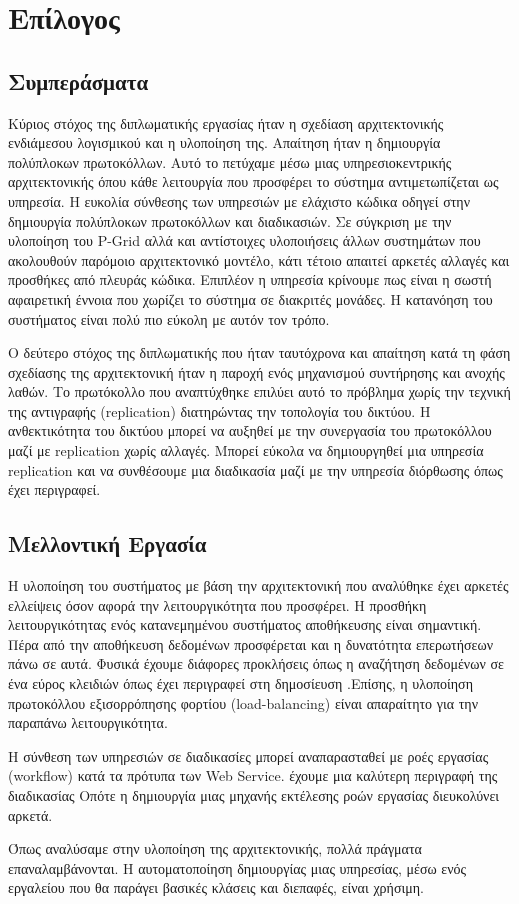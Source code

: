 \chapter{Επίλογος}
\label{chap:Closing}

\section{Συμπεράσματα}

Κύριος στόχος της διπλωματικής εργασίας ήταν η σχεδίαση αρχιτεκτονικής 
ενδιάμεσου λογισμικού και η υλοποίηση της. Απαίτηση ήταν η δημιουργία 
πολύπλοκων πρωτοκόλλων. Αυτό το πετύχαμε μέσω μιας υπηρεσιοκεντρικής 
αρχιτεκτονικής όπου κάθε λειτουργία που προσφέρει το σύστημα αντιμετωπίζεται 
ως υπηρεσία. Η ευκολία σύνθεσης των υπηρεσιών με ελάχιστο κώδικα οδηγεί 
στην δημιουργία πολύπλοκων πρωτοκόλλων και διαδικασιών. Σε σύγκριση με 
την υλοποίηση του P-Grid αλλά και αντίστοιχες υλοποιήσεις άλλων συστημάτων 
που ακολουθούν παρόμοιο αρχιτεκτονικό μοντέλο, κάτι τέτοιο απαιτεί αρκετές 
αλλαγές και προσθήκες από πλευράς κώδικα. 
Επιπλέον η υπηρεσία κρίνουμε πως είναι η σωστή αφαιρετική έννοια που χωρίζει 
το σύστημα σε διακριτές μονάδες. Η κατανόηση του συστήματος είναι πολύ πιο 
εύκολη με αυτόν τον τρόπο.

Ο δεύτερο στόχος της διπλωματικής που ήταν ταυτόχρονα και απαίτηση κατά τη 
φάση σχεδίασης της αρχιτεκτονική ήταν η παροχή ενός μηχανισμού συντήρησης και 
ανοχής λαθών. Το πρωτόκολλο που αναπτύχθηκε επιλύει αυτό το πρόβλημα χωρίς 
την τεχνική της αντιγραφής (replication) διατηρώντας την τοπολογία του 
δικτύου. Η ανθεκτικότητα του δικτύου μπορεί να αυξηθεί με την συνεργασία 
του πρωτοκόλλου μαζί με replication χωρίς αλλαγές. Μπορεί εύκολα να 
δημιουργηθεί μια υπηρεσία replication και να συνθέσουμε μια διαδικασία 
μαζί με την υπηρεσία διόρθωσης όπως έχει περιγραφεί. 

\section{Μελλοντική Εργασία}

Η υλοποίηση του συστήματος με βάση την αρχιτεκτονική που αναλύθηκε 
έχει αρκετές ελλείψεις όσον αφορά την λειτουργικότητα που προσφέρει. 
Η προσθήκη λειτουργικότητας ενός κατανεμημένου συστήματος αποθήκευσης 
είναι σημαντική. Πέρα από την αποθήκευση δεδομένων προσφέρεται και η 
δυνατότητα επερωτήσεων πάνω σε αυτά. Φυσικά έχουμε διάφορες προκλήσεις 
όπως η αναζήτηση δεδομένων σε ένα εύρος κλειδιών όπως έχει περιγραφεί 
στη δημοσίευση \citep{Grasp}.Επίσης, η υλοποίηση πρωτοκόλλου 
εξισορρόπησης φορτίου (load-balancing) είναι απαραίτητο για την παραπάνω 
λειτουργικότητα.

Η σύνθεση των υπηρεσιών σε διαδικασίες μπορεί αναπαρασταθεί με 
ροές εργασίας (workflow) κατά τα πρότυπα των Web Service. 
έχουμε μια καλύτερη περιγραφή της διαδικασίας Οπότε η 
δημιουργία μιας μηχανής εκτέλεσης ροών εργασίας διευκολύνει αρκετά.

Όπως αναλύσαμε στην υλοποίηση της αρχιτεκτονικής, πολλά πράγματα 
επαναλαμβάνονται. Η αυτοματοποίηση δημιουργίας μιας υπηρεσίας, μέσω ενός 
εργαλείου που θα παράγει βασικές κλάσεις και διεπαφές, είναι χρήσιμη.
